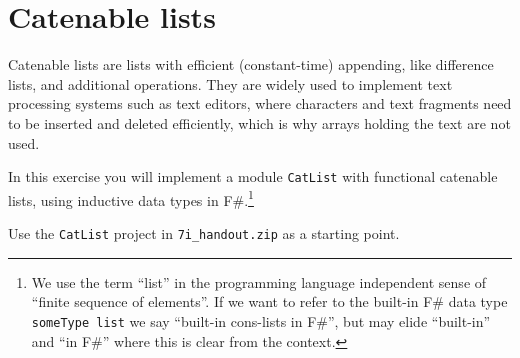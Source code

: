 \section*{Catenable lists}

Catenable lists are lists with efficient (constant-time) appending, like difference lists, and additional operations.  They are widely used to implement text processing systems such as text editors, where characters and text fragments need to be inserted and deleted efficiently, which is why arrays holding the text are not used.

In this exercise you will implement a module \texttt{CatList} with functional catenable lists, using inductive data types in F\#.\footnote{We use the term ``list'' in the programming language independent sense of ``finite sequence of elements''.  If we want to refer to the built-in F\# data type \texttt{someType list} we say ``built-in cons-lists in F\#'', but may elide ``built-in'' and ``in F\#'' where this is clear from the context.}


Use the \texttt{CatList} project in \texttt{7i\_handout.zip} as a starting point.